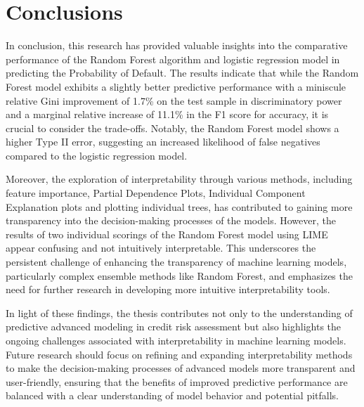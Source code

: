 \chapter{Conclusions}

In conclusion, this research has provided valuable insights into the comparative performance of the Random Forest algorithm and logistic regression model in predicting the Probability of Default. The results indicate that while the Random Forest model exhibits a slightly better predictive performance with a miniscule relative Gini improvement of 1.7\% on the test sample in discriminatory power and a marginal relative increase of 11.1\% in the F1 score for accuracy, it is crucial to consider the trade-offs. Notably, the Random Forest model shows a higher Type II error, suggesting an increased likelihood of false negatives compared to the logistic regression model.

Moreover, the exploration of interpretability through various methods, including feature importance, Partial Dependence Plots, Individual Component Explanation plots and plotting individual trees, has contributed to gaining more transparency into the decision-making processes of the models. However, the results of two individual scorings of the Random Forest model using LIME appear confusing and not intuitively interpretable. This underscores the persistent challenge of enhancing the transparency of machine learning models, particularly complex ensemble methods like Random Forest, and emphasizes the need for further research in developing more intuitive interpretability tools.

In light of these findings, the thesis contributes not only to the understanding of predictive advanced modeling in credit risk assessment but also highlights the ongoing challenges associated with interpretability in machine learning models. Future research should focus on refining and expanding interpretability methods to make the decision-making processes of advanced models more transparent and user-friendly, ensuring that the benefits of improved predictive performance are balanced with a clear understanding of model behavior and potential pitfalls.